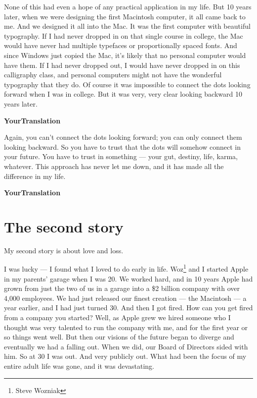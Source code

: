 \documentclass[a4,twocolumn]{article}
\begin{document}
None of this had even a hope of any practical application in my life. But 10 years later, when we were designing the first Macintosh computer, it all came back to me. And we designed it all into the Mac. It was the first computer with beautiful typography. If I had never dropped in on that single course in college, the Mac would have never had multiple typefaces or proportionally spaced fonts. And since Windows just copied the Mac, it's likely that no personal computer would have them. If I had never dropped out, I would have never dropped in on this calligraphy class, and personal computers might not have the wonderful typography that they do. Of course it was impossible to connect the dots looking forward when I was in college. But it was very, very clear looking backward 10 years later.

\newpage

{\bf YourTranslation}

\newpage

Again, you can't connect the dots looking forward; you can only connect them looking backward. So you have to trust that the dots will somehow connect in your future. You have to trust in something — your gut, destiny, life, karma, whatever. This approach has never let me down, and it has made all the difference in my life.

\newpage

{\bf YourTranslation}

\newpage

\section*{The second story}

My second story is about love and loss.

I was lucky — I found what I loved to do early in life. Woz\footnote{Steve Wozniak} and I started Apple in my parents' garage when I was 20. We worked hard, and in 10 years Apple had grown from just the two of us in a garage into a \$2 billion company with over 4,000 employees. We had just released our finest creation — the Macintosh — a year earlier, and I had just turned 30. And then I got fired. How can you get fired from a company you started? Well, as Apple grew we hired someone who I thought was very talented to run the company with me, and for the first year or so things went well. But then our visions of the future began to diverge and eventually we had a falling out. When we did, our Board of Directors sided with him. So at 30 I was out. And very publicly out. What had been the focus of my entire adult life was gone, and it was devastating.
\end{document}
